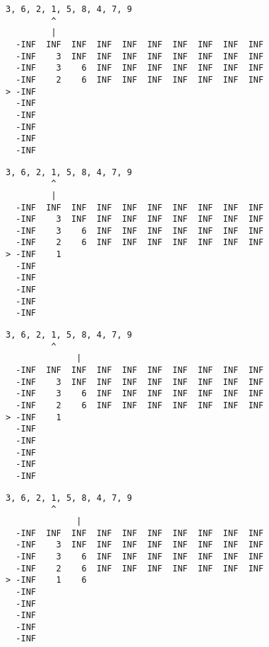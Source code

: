 { \begin{verbatim}
3, 6, 2, 1, 5, 8, 4, 7, 9
         ^
         |
  -INF  INF  INF  INF  INF  INF  INF  INF  INF  INF
  -INF    3  INF  INF  INF  INF  INF  INF  INF  INF
  -INF    3    6  INF  INF  INF  INF  INF  INF  INF
  -INF    2    6  INF  INF  INF  INF  INF  INF  INF
> -INF                                             
  -INF                                             
  -INF                                             
  -INF                                             
  -INF                                             
  -INF                                             
\end{verbatim} }

{ \begin{verbatim}
3, 6, 2, 1, 5, 8, 4, 7, 9
         ^
         |
  -INF  INF  INF  INF  INF  INF  INF  INF  INF  INF
  -INF    3  INF  INF  INF  INF  INF  INF  INF  INF
  -INF    3    6  INF  INF  INF  INF  INF  INF  INF
  -INF    2    6  INF  INF  INF  INF  INF  INF  INF
> -INF    1                                        
  -INF                                             
  -INF                                             
  -INF                                             
  -INF                                             
  -INF                                             
\end{verbatim} }

{ \begin{verbatim}
3, 6, 2, 1, 5, 8, 4, 7, 9
         ^
              |
  -INF  INF  INF  INF  INF  INF  INF  INF  INF  INF
  -INF    3  INF  INF  INF  INF  INF  INF  INF  INF
  -INF    3    6  INF  INF  INF  INF  INF  INF  INF
  -INF    2    6  INF  INF  INF  INF  INF  INF  INF
> -INF    1                                        
  -INF                                             
  -INF                                             
  -INF                                             
  -INF                                             
  -INF                                             
\end{verbatim} }

{ \begin{verbatim}
3, 6, 2, 1, 5, 8, 4, 7, 9
         ^
              |
  -INF  INF  INF  INF  INF  INF  INF  INF  INF  INF
  -INF    3  INF  INF  INF  INF  INF  INF  INF  INF
  -INF    3    6  INF  INF  INF  INF  INF  INF  INF
  -INF    2    6  INF  INF  INF  INF  INF  INF  INF
> -INF    1    6                                   
  -INF                                             
  -INF                                             
  -INF                                             
  -INF                                             
  -INF                                             
\end{verbatim} }

